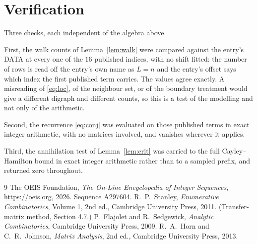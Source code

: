 \documentclass[11pt,a4paper]{article}
\theoremstyle{plain}
\theoremstyle{definition}
\begin{document}
\section{Verification}

Three checks, each independent of the algebra above.

First, the walk counts of Lemma~\ref{lem:walk} were compared against the entry's DATA at
every one of the $16$ published indices, with no shift fitted: the number of rows is
read off the entry's own name as $L=n$ and the entry's offset says which index the first
published term carries. The values agree exactly. A misreading of \eqref{eq:loc}, of the
neighbour set, or of the boundary treatment would give a different digraph and different
counts, so this is a test of the modelling and not only of the arithmetic.

Second, the recurrence \eqref{eq:conj} was evaluated on those published terms in exact
integer arithmetic, with no matrices involved, and vanishes wherever it applies.

Third, the annihilation test of Lemma~\ref{lem:crit} was carried to the full
Cayley--Hamilton bound in exact integer arithmetic rather than to a sampled prefix, and
returned zero throughout.

\begin{thebibliography}{9}
 The OEIS Foundation, \emph{The On-Line Encyclopedia of Integer
Sequences}, \url{https://oeis.org}, 2026. Sequence A297604.
 R.~P.~Stanley, \emph{Enumerative Combinatorics}, Volume 1, 2nd ed.,
Cambridge University Press, 2011. (Transfer-matrix method, Section 4.7.)
 P.~Flajolet and R.~Sedgewick, \emph{Analytic Combinatorics}, Cambridge
University Press, 2009.
 R.~A.~Horn and C.~R.~Johnson, \emph{Matrix Analysis}, 2nd ed., Cambridge
University Press, 2013.
\end{thebibliography}
\end{document}
